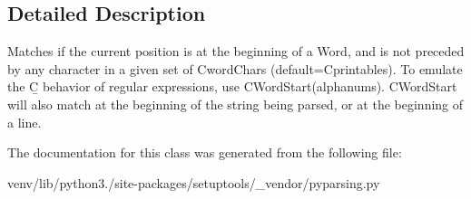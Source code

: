 \subsection{Detailed Description}
\begin{DoxyVerb}Matches if the current position is at the beginning of a Word, and
is not preceded by any character in a given set of C{wordChars}
(default=C{printables}). To emulate the C{\b} behavior of regular expressions,
use C{WordStart(alphanums)}. C{WordStart} will also match at the beginning of
the string being parsed, or at the beginning of a line.
\end{DoxyVerb}
 

The documentation for this class was generated from the following file\+:\begin{DoxyCompactItemize}
\item 
venv/lib/python3./site-\/packages/setuptools/\+\_\+vendor/pyparsing.\+py\end{DoxyCompactItemize}
